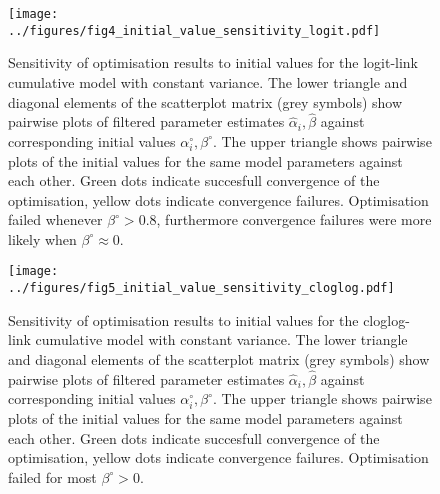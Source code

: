 \begin{figure}[p]
  \centering
  \texttt{[image: ../figures/fig4\_initial\_value\_sensitivity\_logit.pdf]}
  \caption{Sensitivity of optimisation results to initial values for the logit-link cumulative model with constant variance. The lower triangle and diagonal elements of the scatterplot matrix (grey symbols) show pairwise plots of filtered parameter estimates $\hat{\alpha}_i, \hat{\beta}$  against corresponding initial values $\alpha^{\circ}_i, \beta^{\circ}$. The upper triangle shows pairwise plots of the initial values for the same model parameters against each other. Green dots indicate succesfull convergence of the optimisation, yellow dots indicate convergence failures. Optimisation failed whenever $\beta^{\circ}>0.8$, furthermore convergence failures were more likely when $\beta^{\circ}\approx 0$.}
  \label{fig:fig4}
\end{figure} 

\begin{figure}[p]
  \centering
  \texttt{[image: ../figures/fig5\_initial\_value\_sensitivity\_cloglog.pdf]}
  \caption{Sensitivity of optimisation results to initial values for the cloglog-link cumulative model with constant variance. The lower triangle and diagonal elements of the scatterplot matrix (grey symbols) show pairwise plots of filtered parameter estimates $\hat{\alpha}_i, \hat{\beta}$ against corresponding initial values $\alpha^{\circ}_i, \beta^{\circ}$. The upper triangle shows pairwise plots of the initial values for the same model parameters against each other. Green dots indicate succesfull convergence of the optimisation, yellow dots indicate convergence failures. Optimisation failed for most $\beta^{\circ}>0$.}
  \label{fig:fig5}
\end{figure} 